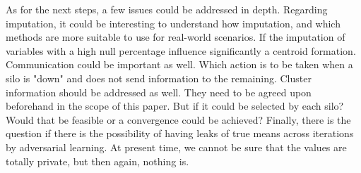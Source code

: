 As for the next steps, a few issues could be addressed in depth. Regarding imputation, it could be interesting to understand how imputation, and which methods are more suitable to use for real-world scenarios. If the imputation of variables with a high null percentage influence significantly a centroid formation.
Communication could be important as well. Which action is to be taken when a silo is "down" and does not send information to the remaining. Cluster information should be addressed as well. They need to be agreed upon beforehand in the scope of this paper. But if it could be selected by each silo? Would that be feasible or a convergence could be achieved?
Finally, there is the question if there is the possibility of having leaks of true means across iterations by adversarial learning. At present time, we cannot be sure that the values are totally private, but then again, nothing is.


